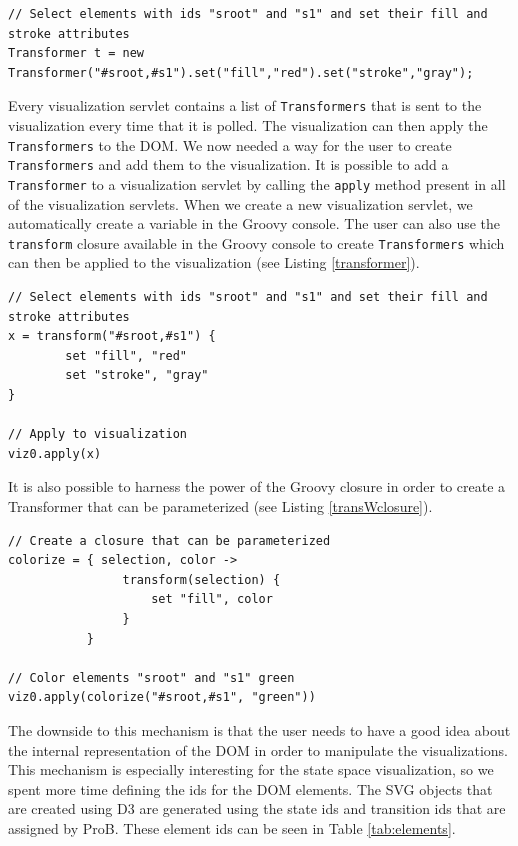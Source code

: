 \lstset{language=java}
\begin{lstlisting}[caption=Define a \texttt{Transformer} in Java,label=javaTransformer]
// Select elements with ids "sroot" and "s1" and set their fill and stroke attributes
Transformer t = new Transformer("#sroot,#s1").set("fill","red").set("stroke","gray");
\end{lstlisting}

Every visualization servlet contains a list of \texttt{Transformers} that is sent to the visualization every time that it is polled. The visualization can then apply the \texttt{Transformers} to the DOM. We now needed a way for the user to create \texttt{Transformers} and add them to the visualization. It is possible to add a \texttt{Transformer} to a visualization servlet by calling the \texttt{apply} method present in all of the visualization servlets. When we create a new visualization servlet, we automatically create a variable in the Groovy console. The user can also use the \texttt{transform} closure available in the Groovy console to create \texttt{Transformers} which can then be applied to the visualization (see Listing \ref{transformer}).

\lstset{language=java}
\begin{lstlisting}[caption=Define rules for the transformation of visualization elements,label=transformer]
// Select elements with ids "sroot" and "s1" and set their fill and stroke attributes
x = transform("#sroot,#s1") {
        set "fill", "red"
        set "stroke", "gray"
}

// Apply to visualization
viz0.apply(x)
\end{lstlisting}

It is also possible to harness the power of the Groovy closure in order to create a Transformer that can be parameterized (see Listing \ref{transWclosure}).

\begin{lstlisting}[caption=Use Groovy closures to generate Transformers,label=transWclosure]
// Create a closure that can be parameterized
colorize = { selection, color ->
                transform(selection) {
                    set "fill", color
                }    
           }

// Color elements "sroot" and "s1" green
viz0.apply(colorize("#sroot,#s1", "green"))
\end{lstlisting}

The downside to this mechanism is that the user needs to have a good idea about the internal representation of the DOM in order to manipulate the visualizations. This mechanism is especially interesting for the state space visualization, so we spent more time defining the ids for the DOM elements. The SVG objects that are created using D3 are generated using the state ids and transition ids that are assigned by ProB. These element ids can be seen in Table \ref{tab:elements}.

